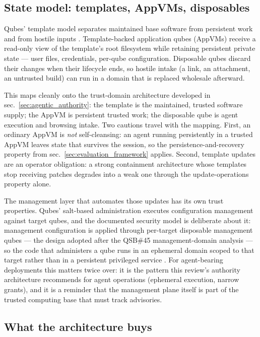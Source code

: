 \documentclass[
  english,
  9pt,
]{extarticle}
\begin{document}
\subsection{State model: templates, AppVMs,
disposables}\label{state-model-templates-appvms-disposables}

Qubes' template model separates maintained base software from persistent
work and from hostile inputs \citep{qubes_templates, qubes_disposables}.
Template-backed application qubes (AppVMs) receive a read-only view of
the template's root filesystem while retaining persistent private state
--- user files, credentials, per-qube configuration. Disposable qubes
discard their changes when their lifecycle ends, so hostile intake (a
link, an attachment, an untrusted build) can run in a domain that is
replaced wholesale afterward.

This maps cleanly onto the trust-domain architecture developed in
sec.~\ref{sec:agentic_authority}: the template is the maintained,
trusted software supply; the AppVM is persistent trusted work; the
disposable qube is agent execution and browsing intake. Two cautions
travel with the mapping. First, an ordinary AppVM is \emph{not}
self-cleansing: an agent running persistently in a trusted AppVM leaves
state that survives the session, so the persistence-and-recovery
property from sec.~\ref{sec:evaluation_framework} applies. Second,
template updates are an operator obligation: a strong containment
architecture whose templates stop receiving patches degrades into a weak
one through the update-operations property alone.

The management layer that automates those updates has its own trust
properties. Qubes' salt-based administration executes configuration
management against target qubes, and the documented security model is
deliberate about it: management configuration is applied through
per-target disposable management qubes --- the design adopted after the
QSB\#45 management-domain analysis --- so the code that administers a
qube runs in an ephemeral domain scoped to that target rather than in a
persistent privileged service \citep{qubes_salt_administration}. For
agent-bearing deployments this matters twice over: it is the pattern
this review's authority architecture recommends for agent operations
(ephemeral execution, narrow grants), and it is a reminder that the
management plane itself is part of the trusted computing base that must
track advisories.

\subsection{What the architecture
buys}\label{what-the-architecture-buys}
\end{document}
